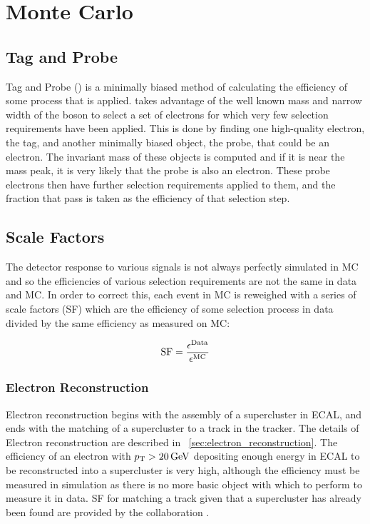 \chapter{Monte Carlo}
\label{chatper:monte_carlo}

\section{Tag and Probe}

Tag and Probe (\TnP) is a minimally biased method of calculating the efficiency
of some process that is applied. \TnP takes advantage of the well known mass
and narrow width of the \Z boson to select a set of electrons for which very
few selection requirements have been applied. This is done by finding one
high-quality electron, the tag, and another minimally biased object, the probe,
that could be an electron. The invariant mass of these objects is computed and
if it is near the \Z mass peak, it is very likely that the probe is also an
electron. These probe electrons then have further selection requirements
applied to them, and the fraction that pass is taken as the efficiency of that
selection step.

\section{Scale Factors}

The detector response to various signals is not always perfectly simulated in
MC and so the efficiencies of various selection requirements are not the same
in data and MC. In order to correct this, each event in MC is reweighed with a
series of scale factors (SF) which are the efficiency of some selection process
in data divided by the same efficiency as measured on MC:

\begin{equation}
    \label{eq:sf}
    \text{SF} = \frac{\epsilon^{\text{Data}}}{\epsilon^{\text{MC}}}
\end{equation}

\subsection{Electron Reconstruction}

Electron reconstruction begins with the assembly of a supercluster in ECAL, and
ends with the matching of a supercluster to a track in the tracker. The details
of Electron reconstruction are described in
\SEC~\ref{sec:electron_reconstruction}. The efficiency of an electron with $p_{\mathrm{T}}
> 20 \,\text{Ge\hspace{-.08em}V}$ depositing enough energy in ECAL to be reconstructed into a
supercluster is very high, although the efficiency must be measured in
simulation as there is no more basic object with which to perform \TnP to
measure it in data. SF for matching a track given that a supercluster has
already been found are provided by the collaboration
\cite{gsf_scale_factors_2013}.

